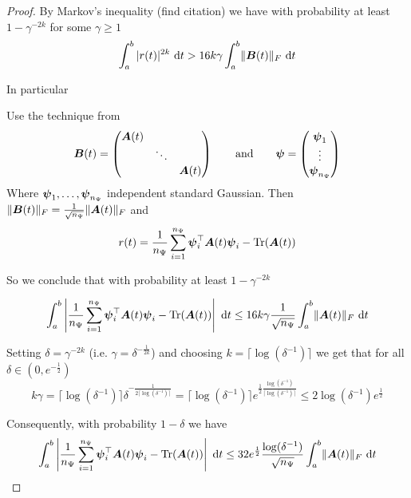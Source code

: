 \documentclass[12pt]{article}
\begin{document}
\begin{proof}
By Markov's inequality (find citation) we have with probability at least $1 - \gamma^{-2 k}$ for some $\gamma \geq 1$
\begin{equation}
    \int_{a}^{b} |r(t)|^{2 k}~\mathrm{d}t > 16 k \gamma \int_{a}^{b} \lVert \boldsymbol{B}(t) \rVert _F~\mathrm{d}t
\end{equation}

In particular

Use the technique from \cite[Proof of Theorem 1]{cortinovis-2022-randomized-trace}
\begin{equation}
    \boldsymbol{B}(t)
    = \begin{pmatrix}
        \boldsymbol{A}(t) & & \\
        & \ddots & \\
        & & \boldsymbol{A}(t)
    \end{pmatrix}
    \qquad \text{and} \qquad
    \boldsymbol{\psi} = \begin{pmatrix}
        \boldsymbol{\psi}_1 \\
        \vdots \\
        \boldsymbol{\psi}_{n_{\Psi}}
    \end{pmatrix}
\end{equation}
Where $\boldsymbol{\psi}_1, \dots, \boldsymbol{\psi}_{n_{\Psi}}$ independent standard Gaussian. Then $\lVert \boldsymbol{B}(t) \rVert _F = \frac{1}{\sqrt{n_{\Psi}}} \lVert \boldsymbol{A}(t) \rVert _F$ and
\begin{equation}
    r(t) = \frac{1}{n_{\Psi}} \sum_{i=1}^{n_{\Psi}} \boldsymbol{\psi}_i^{\top} \boldsymbol{A}(t) \boldsymbol{\psi}_i - \operatorname{Tr}(\boldsymbol{A}(t))
\end{equation}

So we conclude that with probability at least $1 - \gamma^{-2 k}$

\begin{equation}
    \int_{a}^{b} \left| \frac{1}{n_{\Psi}} \sum_{i=1}^{n_{\Psi}} \boldsymbol{\psi}_i^{\top} \boldsymbol{A}(t) \boldsymbol{\psi}_i - \operatorname{Tr}(\boldsymbol{A}(t)) \right| ~ \mathrm{d}t \leq 16 k \gamma \frac{1}{\sqrt{n_{\Psi}}} \int_{a}^{b} \lVert \boldsymbol{A}(t) \rVert _F~\mathrm{d}t
\end{equation}

Setting $\delta = \gamma^{-2 k}$ (i.e. $\gamma = \delta^{-\frac{1}{2k}}$) and choosing $k = \lceil \log(\delta^{-1}) \rceil$ we get that for all $\delta \in (0, e^{-\frac{1}{2}})$
\begin{equation}
    k \gamma = \lceil \log(\delta^{-1}) \rceil \delta^{-\frac{1}{2\lceil \log(\delta^{-1}) \rceil}}
    = \lceil \log(\delta^{-1}) \rceil e^{\frac{1}{2}\frac{\log(\delta^{-1})}{\lceil \log(\delta^{-1}) \rceil}}
    \leq 2 \log(\delta^{-1}) e^{\frac{1}{2}}
\end{equation}

Consequently, with probability $1 - \delta$ we have
\begin{equation}
    \int_{a}^{b} \left| \frac{1}{n_{\Psi}} \sum_{i=1}^{n_{\Psi}} \boldsymbol{\psi}_i^{\top} \boldsymbol{A}(t) \boldsymbol{\psi}_i - \operatorname{Tr}(\boldsymbol{A}(t)) \right| ~ \mathrm{d}t \leq 32 e^{\frac{1}{2}} \frac{\log(\delta^{-1})}{\sqrt{n_{\Psi}}} \int_{a}^{b} \lVert \boldsymbol{A}(t) \rVert _F~\mathrm{d}t
\end{equation}

\end{proof}
\end{document}
